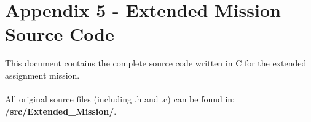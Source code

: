 \documentclass[12pt]{article}
\begin{document}
\section*{Appendix 5 - Extended Mission Source Code}

This document contains the complete source code written in C for the extended assignment mission.\\\\
All original source files (including .h and .c) can be found in: \textbf{/src/Extended\_Mission/}.
\end{document}
